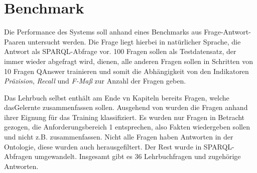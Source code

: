 \documentclass[utf8,biblatex]{lni}
\begin{document}
\section{Benchmark}

Die Performance des Systems soll anhand eines Benchmarks aus Frage-Antwort-Paaren untersucht werden.
Die Frage liegt hierbei in natürlicher Sprache, die Antwort als SPARQL-Abfrage vor.
100 Fragen sollen als Testdatensatz, der immer wieder abgefragt wird, dienen,
alle anderen Fragen sollen in Schritten von 10 Fragen QAnswer trainieren und somit die Abhängigkeit von den Indikatoren \emph{Präzision}, \emph{Recall} und \emph{F-Maß} zur Anzahl der Fragen geben.

Das Lehrbuch selbst \cite{bb} enthält am Ende vn Kapiteln bereits Fragen, welche dasGelernte zusammenfassen sollen.
Ausgehend von \cite{arneba} wurden die Fragen anhand ihrer Eignung für das Training klassifiziert.
Es wurden nur Fragen in Betracht gezogen, die Anforderungsbereich 1 entsprechen, also Fakten wiedergeben sollen und nicht z.B. zusammenfassen.
Nicht alle Fragen haben Antworten in der Ontologie, diese wurden auch herausgefiltert.
Der Rest wurde in SPARQL-Abfragen umgewandelt.
Insgesamt gibt es 36 Lehrbuchfragen und zugehörige Antworten.
\end{document}
